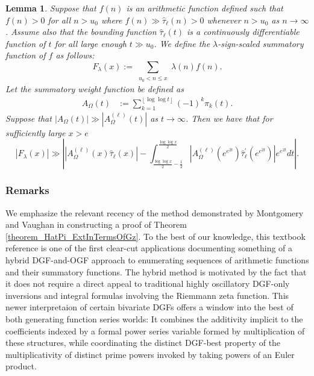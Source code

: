 \documentclass[11pt,reqno,a4letter]{article}
\numberwithin{figure}{section}
\numberwithin{table}{section}
\newcommand{\floor}[1]{\left\lfloor #1 \right\rfloor}
\theoremstyle{plain}
\newtheorem{lemma}[theorem]{Lemma}
\numberwithin{theorem}{section}
\theoremstyle{definition}
\newcommand{\SuccSim}[0]{\overset{_{\scriptsize{\blacktriangle}}}{\succsim}}
\renewcommand{\SuccSim}[0]{\ensuremath{\gg}}
\begin{document}
\begin{lemma} 
\label{lemma_CLT_and_AbelSummation} 
Suppose that $f(n)$ is an arithmetic function defined 
such that $f(n) > 0$ for all $n > u_0$ where 
$f(n) \SuccSim \widehat{\tau}_{\ell}(n) > 0$ whenever $n > u_0$ 
as $n \rightarrow \infty$. Assume also that 
the bounding function $\widehat{\tau}_{\ell}(t)$ is a 
continuously differentiable function of $t$ for all 
large enough $t \gg u_0$.  
We define the $\lambda$-sign-scaled summatory function of $f$ as follows: 
\[
F_{\lambda}(x) := \sum_{\substack{u_0 < n \leq x}} \lambda(n) f(n). 
\]
Let the summatory weight function be defined as 
\begin{align*} 
A_{\Omega}(t) & := \sum_{k=1}^{\floor{\log\log t}} (-1)^k \widehat{\pi}_k(t). 
\end{align*} 
Suppose that $|A_{\Omega}(t)| \gg |A_{\Omega}^{(\ell)}(t)|$ as $t \rightarrow \infty$. 
Then we have that for sufficiently large $x > e$ 
\begin{equation} 
\label{eqn_Flambdax_RHA_AbelSummationFormula_v1} 
|F_{\lambda}(x)| \SuccSim \left\lvert 
     \left\lvert A_{\Omega}^{(\ell)}(x) \widehat{\tau}_{\ell}(x) \right\rvert - 
     \int_{\frac{\log\log x}{2} - \frac{1}{2}}^{\frac{\log\log x}{2}} 
     \left\lvert A_{\Omega}^{(\ell)}\left(e^{e^{2t}}\right) 
     \widehat{\tau}_{\ell}^{\prime}\left(e^{e^{2t}}\right) 
     \right\rvert e^{e^{2t}} dt 
     \right\rvert.  
\end{equation} 
\end{lemma} 

\subsubsection{Remarks} 

We emphasize the relevant recency of the method demonstrated by 
Montgomery and Vaughan in constructing a proof of 
Theorem \ref{theorem_HatPi_ExtInTermsOfGz}. 
To the best of our knowledge, this textbook reference is 
one of the first clear-cut applications documenting something of a hybrid 
DGF-and-OGF approach to enumerating sequences of arithmetic functions 
and their summatory functions. The hybrid method is motivated by the fact that it 
does not require a direct appeal to 
traditional highly oscillatory DGF-only inversions and integral formulas 
involving the Riemmann zeta function. 
This newer interpretaion of certain bivariate DGFs 
offers a window into the best of both generating function series worlds: 
It combines the additivity 
implicit to the coefficients indexed by a formal power series variable formed by 
multiplication of these structures, while coordinating the distinct DGF-best 
property of the multiplicativity of distinct prime powers invoked 
by taking powers of an Euler product. 
\end{document}
